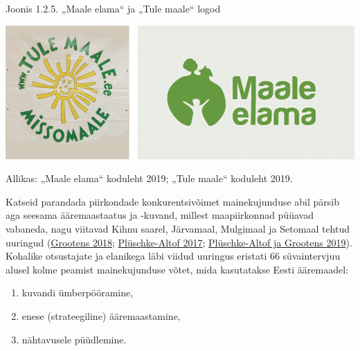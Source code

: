 \documentclass[estonian,]{article}
\begin{document}
{Joonis 1.2.5.} „Maale elama`` ja „Tule maale`` logod

\begin{center}\includegraphics[width=1\linewidth]{figures/1-chapter/fig125} \end{center}

\begin{imgsource}
{Allikas:} „Maale elama`` koduleht 2019; „Tule maale`` koduleht 2019.
\end{imgsource}

Katseid parandada piirkondade konkurentsivõimet mainekujunduse abil pärsib aga seesama ääremaastaatus ja -kuvand, millest maapiirkonnad püüavad vabaneda, nagu viitavad Kihnu saarel, Järvamaal, Mulgimaal ja Setomaal tehtud uuringud (\protect\hyperlink{Grootens2018}{Grootens 2018}; \protect\hyperlink{Pluxfcschke-Altof2017}{Plüschke-Altof 2017}; \protect\hyperlink{Pluxfcschke-Altof2019}{Plüschke-Altof ja Grootens 2019}). Kohalike otsustajate ja elanikega läbi viidud uuringus eristati 66 süvaintervjuu alusel kolme peamist mainekujunduse võtet, mida kasutatakse Eesti ääremaadel:

\begin{enumerate}
\def\labelenumi{\arabic{enumi})}
\item
  kuvandi ümberpööramine,
\item
  enese (strateegiline) ääremaastamine,
\item
  nähtavusele püüdlemine.
\end{enumerate}
\end{document}
